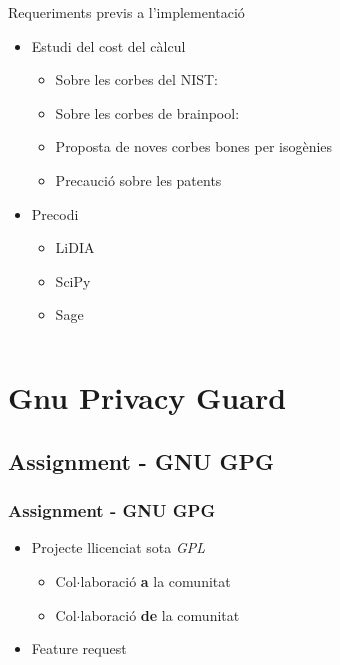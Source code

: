 \documentclass{beamer}
\def\lgem{l\ensuremath{\cdot}l}
\theoremstyle{saltolinea}   			%
\begin{document}
\begin{frame}
  \begin{columns}[H]
      \begin{center}
        \begin{block}{Requeriments previs a l'implementaci\'o}
          \begin{itemize}
            \item<2-> Estudi del cost del c\`alcul
            \begin{itemize}
              \item<3-> Sobre les corbes del NIST: \\ 
              \item<5-> Sobre les corbes de brainpool:\\ 
              \item<7-> Proposta de noves corbes bones per isog\`enies
              \item<8-> Precauci\'o sobre les patents
            \end{itemize}
            \item<9-> Precodi
            \begin{itemize}
              \item<10-> LiDIA
              \item<11-> SciPy
              \item<12-> Sage
            \end{itemize}
          \end{itemize}
        \end{block}
      \end{center}
  \end{columns}
\end{frame}

\section{Gnu Privacy Guard}

\subsection{Assignment - GNU GPG}

\begin{frame}
  \frametitle{Assignment - GNU GPG}
  \begin{itemize}
    \item<2-> Projecte llicenciat sota \emph{GPL}
    \begin{itemize}
      \item<3-> Co\lgem{}aboraci\'o \textbf{a} la comunitat
      \item<4-> Co\lgem{}aboraci\'o \textbf{de} la comunitat
    \end{itemize}
      \item<5-> Feature request
  \end{itemize}
\end{frame}
\end{document}
